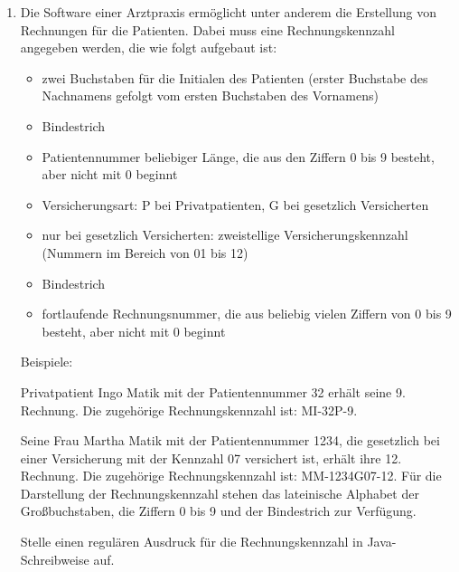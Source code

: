 \documentclass{bschlangaul-aufgabe}
\begin{document}
\begin{enumerate}


\item Die Software einer Arztpraxis ermöglicht unter anderem die
Erstellung von Rechnungen für die Patienten. Dabei muss eine
Rechnungskennzahl angegeben werden, die wie folgt aufgebaut ist:

\begin{itemize}
\item zwei Buchstaben für die Initialen des Patienten (erster Buchstabe
des Nachnamens gefolgt vom ersten Buchstaben des Vornamens)

\item Bindestrich

\item Patientennummer beliebiger Länge, die aus den Ziffern 0 bis 9
besteht, aber nicht mit 0 beginnt

\item Versicherungsart: P bei Privatpatienten, G bei gesetzlich
Versicherten

\item nur bei gesetzlich Versicherten: zweistellige
Versicherungskennzahl (Nummern im Bereich von 01 bis 12)

\item Bindestrich

\item fortlaufende Rechnungsnummer, die aus beliebig vielen Ziffern von
0 bis 9 besteht, aber nicht mit 0 beginnt

\end{itemize}

Beispiele:

Privatpatient Ingo Matik mit der Patientennummer 32 erhält seine 9.
Rechnung. Die zugehörige Rechnungskennzahl ist: MI-32P-9.

Seine Frau Martha Matik mit der Patientennummer 1234, die gesetzlich bei
einer Versicherung mit der Kennzahl 07 versichert ist, erhält ihre 12.
Rechnung. Die zugehörige Rechnungskennzahl ist: MM-1234G07-12. Für die
Darstellung der Rechnungskennzahl stehen das lateinische Alphabet der
Großbuchstaben, die Ziffern 0 bis 9 und der Bindestrich zur Verfügung.

Stelle einen regulären Ausdruck für die Rechnungskennzahl in
Java-Schreibweise auf.

\begin{bAntwort}
\end{bAntwort}


\end{enumerate}
\end{document}
